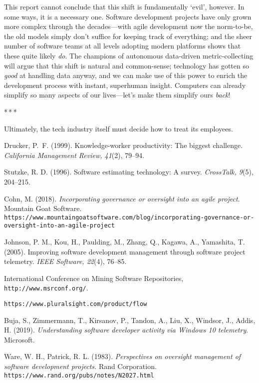\documentclass[12pt]{article}
\newcommand{\parbreak}{\bigskip\par\centerline{*\,*\,*}\medskip\par}
\begin{document}
	This report cannot conclude that this shift is fundamentally `evil', however. In some ways, it is a necessary one. Software development projects have only grown more complex through the decades---with agile development now the norm-to-be, the old models simply don't suffice for keeping track of everything; and the sheer number of software teams at all levels adopting modern platforms shows that these quite likely \textit{do}. The champions of autonomous data-driven metric-collecting will argue that this shift is natural and common-sense; technology has gotten so \textit{good} at handling data anyway, and we can make use of this power to enrich the development process with instant, superhuman insight. Computers can already simplify so many aspects of our lives---let's make them simplify ours \textit{back}!
	
	\parbreak
	
	Ultimately, the tech industry itself must decide how to treat its employees. 
	
	\begin{center}
		\hrulefill
	\end{center}
	
	\begin{thebibliography}{9}
		Drucker, P.\ F. (1999). Knowledge-worker productivity: The biggest challenge. \textit{California Management Review, 41}(2), 79--94.

		Stutzke, R. D. (1996). Software estimating technology: A survey. \textit{CrossTalk, 9}(5), 204--215.
		
		Cohn, M. (2018). \textit{Incorporating governance or oversight into an agile project}. Mountain Goat Software.\\
\texttt{https://www.mountaingoatsoftware.com/blog/incorporating-govern\-ance-or-oversight-into-an-agile-project}
		
		Johnson, P. M., Kou, H., Paulding, M., Zhang, Q., Kagawa, A., Yamashita, T. (2005). Improving software development management through software project telemetry. \textit{IEEE Software, 22}(4), 76--85.
		
		International Conference on Mining Software Repositories,\\ \texttt{http://www.msrconf.org/}.
		
		\texttt{https://www.pluralsight.com/product/flow}
		
		Buja, S., Zimmermann, T., Kirsanov, P., Tandon, A., Liu, X., Windsor, J., Addis, H. (2019). \textit{Understanding software developer activity via Windows 10 telemetry}. Microsoft.
		
		Ware, W. H., Patrick, R. L. (1983). \textit{Perspectives on oversight management of software development projects.} Rand Corporation.\\\texttt{https://www.rand.org/pubs/notes/N2027.html}
	\end{thebibliography}
	
\end{document}
